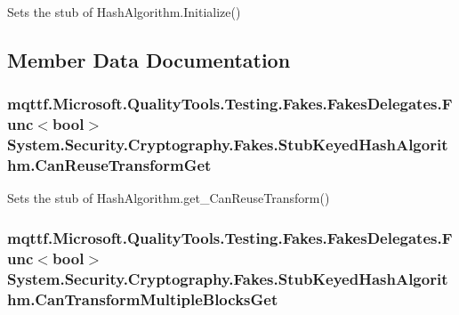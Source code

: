 Sets the stub of Hash\-Algorithm.\-Initialize()



\subsection{Member Data Documentation}
\hypertarget{class_system_1_1_security_1_1_cryptography_1_1_fakes_1_1_stub_keyed_hash_algorithm_aee493d7b2721b6fae25b9339700c182e}{
\subsubsection[{Can\-Reuse\-Transform\-Get}]{\setlength{\rightskip}{0pt plus 5cm}mqttf.\-Microsoft.\-Quality\-Tools.\-Testing.\-Fakes.\-Fakes\-Delegates.\-Func$<$bool$>$ System.\-Security.\-Cryptography.\-Fakes.\-Stub\-Keyed\-Hash\-Algorithm.\-Can\-Reuse\-Transform\-Get}}\label{class_system_1_1_security_1_1_cryptography_1_1_fakes_1_1_stub_keyed_hash_algorithm_aee493d7b2721b6fae25b9339700c182e}


Sets the stub of Hash\-Algorithm.\-get\-\_\-\-Can\-Reuse\-Transform()

\hypertarget{class_system_1_1_security_1_1_cryptography_1_1_fakes_1_1_stub_keyed_hash_algorithm_abd3f3ff2dac0501f07f65793c43db69b}{
\subsubsection[{Can\-Transform\-Multiple\-Blocks\-Get}]{\setlength{\rightskip}{0pt plus 5cm}mqttf.\-Microsoft.\-Quality\-Tools.\-Testing.\-Fakes.\-Fakes\-Delegates.\-Func$<$bool$>$ System.\-Security.\-Cryptography.\-Fakes.\-Stub\-Keyed\-Hash\-Algorithm.\-Can\-Transform\-Multiple\-Blocks\-Get}}\label{class_system_1_1_security_1_1_cryptography_1_1_fakes_1_1_stub_keyed_hash_algorithm_abd3f3ff2dac0501f07f65793c43db69b}


